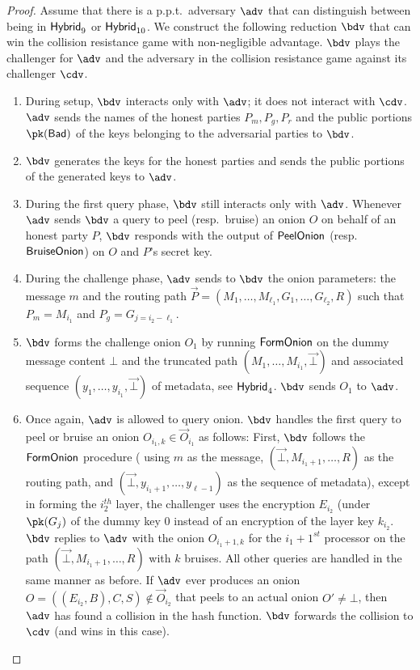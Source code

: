 \documentclass[runningheads,a4paper]{llncs}
\begin{document}
\begin{proof}
Assume that there is a p.p.t.~adversary $\adv$ that can distinguish between being in $\mathsf{Hybrid}_{9}$ or $\mathsf{Hybrid}_{10}$. 
We construct the following reduction $\bdv$ that can win the collision resistance game with non-negligible advantage. $\bdv$ plays the challenger for $\adv$ and the adversary in the collision resistance game against its challenger $\cdv$. 
\begin{enumerate}
\item During setup, $\bdv$ interacts only with $\adv$; it does not interact with $\cdv$. $\adv$ sends the names of the honest parties $P_m, P_g, P_r$ and the public portions $\pk(\Bad)$ of the keys  belonging to the adversarial parties to $\bdv$. 

\item $\bdv$ generates the keys for the honest parties and sends the public portions of the generated keys to $\adv$. 

\item During the first query phase, $\bdv$ still interacts only with $\adv$. Whenever $\adv$ sends $\bdv$ a query to peel (resp.~bruise) an onion $O$ on behalf of an honest party $P$, $\bdv$ responds with the output of $\mathsf{PeelOnion}$ (resp.~$\mathsf{BruiseOnion}$) on $O$ and $P$'s secret key. 

\item During the challenge phase, $\adv$ sends to $\bdv$ the onion parameters: the message $m$ and the routing path $\vec{P} = (M_1, \dots, M_{\ell_1}, G_1, \dots, G_{\ell_2}, R)$ such that $P_m = M_{i_1}$ and $P_g = G_{j=i_2-\ell_1}$. 


\item $\bdv$ forms the challenge onion $O_1$ by running $\mathsf{FormOnion}$ on the dummy message content $\bot$ and the truncated path $(M_1, \dots, M_{i_1}, \vec{\bot})$ and associated sequence $(y_1, \dots, y_{i_1}, \vec{\bot})$ of metadata, see $\mathsf{Hybrid}_{4}$. 
$\bdv$ sends $O_1$ to $\adv$. 

\item Once again, $\adv$ is allowed to query onion. 
%
$\bdv$ handles the first query to peel or bruise an onion $O_{i_1, k} \in \vec{O}_{i_1}$ as follows:  
First, $\bdv$ follows the $\mathsf{FormOnion}$ procedure ( using $m$ as the message, $(\vec{\bot}, M_{i_1+1}, \dots, R)$ as the routing path, and $(\vec{\bot}, y_{i_1+1}, \dots, y_{\ell-1})$ as the sequence of metadata), except in forming the $i_2^\mathit{th}$ layer, the challenger uses the encryption $E_{i_2}$ (under $\pk(G_j)$ of the dummy key $0$ instead of an encryption of the layer key $k_{i_2}$. 
$\bdv$ replies to $\adv$ with the onion $O_{i_1+1, k}$ for the $i_1+1^\mathit{st}$ processor on the path $(\vec{\bot}, M_{i_1+1}, \dots, R)$ with $k$ bruises. 
All other queries are handled in the same manner as before. 
%
If $\adv$ ever produces an onion $O = ((E_{i_2}, B), C, S) \not\in \vec{O}_{i_2}$ that peels to an actual onion $O'\not=\bot$, then $\adv$ has found a collision in the hash function. $\bdv$ forwards the collision to $\cdv$ (and wins in this case). 


\end{enumerate}
\end{proof}
\end{document}
